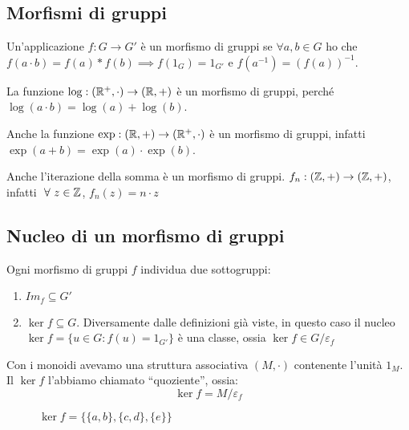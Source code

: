 \subsection{Morfismi di gruppi}

Un'applicazione $f : G \to G'$ \`e un morfismo di gruppi se $\forall a, b \in G$ ho che $f(a \cdot b) = f(a) \ast f(b) \implies f(1_G) = 1_{G'}$ e $f(a^{-1}) = (f(a))^{-1}$.

\begin{exmp} 
La funzione $\log : (\mathbb{R}^{+}, \cdot) \to (\mathbb{R}, +)$ \`e un morfismo di gruppi, perch\'e $\log(a \cdot b) = \log(a) + \log(b)$.

Anche la funzione $\exp : (\mathbb{R}, +) \to (\mathbb{R}^{+}, \cdot)$ \`e un morfismo di gruppi, infatti  $\exp(a + b) = \exp(a) \cdot \exp(b)$.

Anche l'iterazione della somma \`e un morfismo di gruppi. $f_n : (\mathbb{Z}, +) \to (\mathbb{Z}, +) $, infatti $\forall z \in \integers$, $f_n(z) = n \cdot z$
\end{exmp}

\subsection{Nucleo di un morfismo di gruppi}

Ogni morfismo di gruppi $f$ individua due sottogruppi:
\begin{enumerate}
    \item $Im_f \subseteq G'$
    \item $\ker f \subseteq G$. Diversamente dalle definizioni gi\`a viste, in questo caso il nucleo $\ker f = \{ u \in G : f(u) = 1_{G'}\}$ \`e una classe, ossia $\ker f \in G / \varepsilon_f$
\end{enumerate}

Con i monoidi avevamo una struttura associativa $(M, \cdot)$ contenente l'unit\`a $1_M$. Il $\ker f$ l'abbiamo chiamato ``quoziente'', ossia:
\[
\ker f = M / \varepsilon_f
\]

\begin{figure}[ht]
\centering
{}
\caption{\label{fig:esempio_funzione}$\ker f = \{ \{a, b \}, \{ c, d \}, \{ e \}\}$ }
\end{figure}

